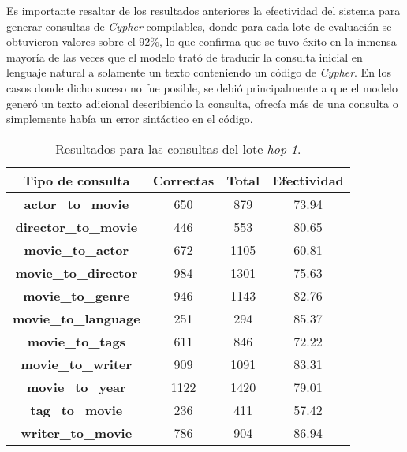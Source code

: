 Es importante resaltar de los resultados anteriores la efectividad del sistema para generar consultas de \textit{Cypher} compilables, donde para cada lote de evaluación se obtuvieron valores sobre el $92\%$, lo que confirma que se tuvo éxito en la inmensa mayoría de las veces que el modelo trató de traducir la consulta inicial en lenguaje natural a solamente un texto conteniendo un código de \textit{Cypher}. En los casos donde dicho suceso no fue posible, se debió principalmente a que el modelo generó un texto adicional describiendo la consulta, ofrecía más de una consulta o simplemente había un error sintáctico en el código.

\begin{table}[H]
\centering
\begin{tabular}{|c|c|c|c|}
\hline
\textbf{Tipo de consulta} & \textbf{Correctas} & \textbf{Total} & \textbf{Efectividad} \\ \hline
\textbf{actor\_to\_movie} & 650 & 879 & 73.94 \\ \hline
\textbf{director\_to\_movie} & 446 & 553 & 80.65 \\ \hline
\textbf{movie\_to\_actor} & 672 & 1105 & 60.81 \\ \hline
\textbf{movie\_to\_director} & 984 & 1301 & 75.63 \\ \hline
\textbf{movie\_to\_genre} & 946 & 1143 & 82.76 \\ \hline
\textbf{movie\_to\_language} & 251 & 294 & 85.37 \\ \hline
\textbf{movie\_to\_tags} & 611 & 846 & 72.22 \\ \hline
\textbf{movie\_to\_writer} & 909 & 1091 & 83.31 \\ \hline
\textbf{movie\_to\_year} & 1122 & 1420 & 79.01 \\ \hline
\textbf{tag\_to\_movie} & 236 & 411 & 57.42 \\ \hline
\textbf{writer\_to\_movie} & 786 & 904 & 86.94 \\ \hline
\end{tabular}
\caption{Resultados para las consultas del lote \textit{hop 1}.}
\label{tab:results3}
\end{table}

